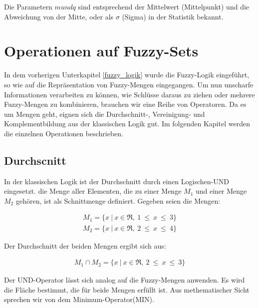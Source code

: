 Die Parametern $m und q$ sind entsprechend der Mittelwert (Mittelpunkt) und die Abweichung von der Mitte, oder als $\sigma$ (Sigma) in der Statistik bekannt.




%
%

\section{Operationen auf Fuzzy-Sets} \label{operatoren}
In dem vorherigen Unterkapitel \ref{fuzzy_logik} wurde die Fuzzy-Logik eingeführt, so wie auf die Repräsentation von Fuzzy-Mengen eingegangen. Um nun unscharfe Informationen verarbeiten zu können, wie Schlüsse daraus zu ziehen oder mehrere Fuzzy-Mengen zu kombinieren, brauchen wir eine Reihe von Operatoren. Da es um Mengen geht, eignen sich die Durchschnitt-, Vereinigung- und Komplementbildung aus der klassischen Logik gut. Im folgenden Kapitel werden die einzelnen Operationen beschrieben.
\subsection{Durchscnitt}\label{AND}

In der klassischen Logik ist der Durchschnitt durch einen Logischen-UND eingesetzt. die Menge aller Elementen, die zu einer Menge $M_1$ und einer Menge $M_2$ gehören,  ist als Schnittmenge definiert. Gegeben seien die Mengen:

\begin{align}
M_1 = \{ x \ | \ x \in\Re, \ 1 \ \leq \ x \ \leq \ 3 \} 
\end{align}
\begin{align}
M_2 = \{ x \ | \ x \in\Re, \ 2 \ \leq \ x \ \leq \ 4 \} 
\end{align}

Der Durchschnitt der beiden Mengen ergibt sich aus:

\begin{align}
M_1 \cap M_2 = \{ x \ | \ x \in \Re, \ 2 \ \leq \ x \ \leq \ 3 \}
\end{align} 

Der UND-Operator lässt sich analog auf die Fuzzy-Mengen anwenden. Es wird die Fläche bestimmt, die für beide Mengen erfüllt ist. Aus methematischer Sicht sprechen wir von dem Minimum-Operator(MIN).

